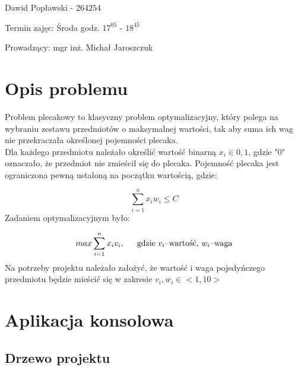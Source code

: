 \documentclass{report}
\begin{document}
\begin{titlepage}
\begin{center}
{			}
		\end{center}
		
		\vspace*{2cm}
		
		\begin{flushright}
			{
				Dawid Popławski - $264254$
				
				Termin zajęc: Środa godz. $17^{\underline{05}}$ - $18^{\underline{45}}$ 
				
				Prowadzący: mgr inż. Michał Jaroszczuk
				
			}
			
		\end{flushright}
		
		\vfill
		
\end{titlepage}

\tableofcontents

\chapter{Opis problemu}

\vspace{5pt}
Problem plecakowy to klasyczny problem optymalizacyjny, który polega na wybraniu zestawu przedmiotów o maksymalnej wartości, tak aby suma ich wag nie przekraczała określonej pojemności plecaka.\\

Dla każdego przedmiotu należało określić wartość binarną $x_i \in {0,1}$, gdzie "0" oznaczało, że przedmiot nie zmieścił się do plecaka. Pojemność plecaka jest ograniczona pewną ustaloną na początku wartością, gdzie:

\[
	\sum_{i=1}^{n}x_iw_i \leq C
\]
Zadaniem optymalizacyjnym było:

\[
	max\sum_{i=1}^{n}x_iv_i, \hspace*{15pt}\text{gdzie } v_i \text{--} \text{wartość, } w_i \text{--} \text{waga}
\]
Na potrzeby projektu należało założyć, że wartość i waga pojedyńczego przedmiotu będzie mieścić się w zakresie $v_i,w_i \in <1,10>$

\chapter{Aplikacja konsolowa}

\section{Drzewo projektu}
\end{document}
